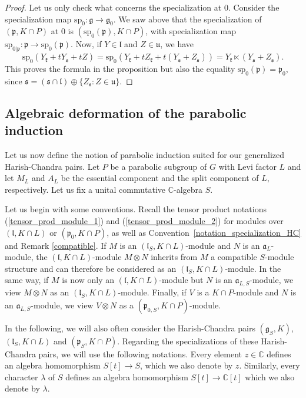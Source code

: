 \documentclass{amsart}
\theoremstyle{definition}
\begin{document}
\begin{proof}
    Let us only check what concerns the specialization at $0$. Consider the specialization map $\mathrm{sp}_0 : \bm{\mathfrak{g}} \to \mathfrak{g}_0$. We saw above that the specialization of  $(\bm{\mathfrak{p}},K\cap P)$ at $0$ is $(\mathrm{sp}_0(\bm{\mathfrak{p}}),K\cap P)$, with specialization map $\mathrm{sp}_{0|\bm{\mathfrak{p}}} : \bm{\mathfrak{p}} \to \mathrm{sp}_0(\bm{\mathfrak{p}})$. Now, if $Y \in \mathfrak{l}$ and $Z \in \mathfrak{u}$, we have
    \[\mathrm{sp}_0(Y_\mathfrak{k} + tY_\mathfrak{s} +tZ) = \mathrm{sp}_0(Y_\mathfrak{k} + tZ_\mathfrak{k} +t (Y_\mathfrak{s} + Z_\mathfrak{s})) = Y_\mathfrak{k} \ltimes (Y_\mathfrak{s} + Z_\mathfrak{s}).\]
    This proves the formula in the proposition but also the equality $\mathrm{sp}_0(\bm{\mathfrak{p}}) = \mathfrak{p}_0$, since $\mathfrak{s} = (\mathfrak{s}\cap \mathfrak{l}) \oplus \{Z_\mathfrak{s} : Z \in \mathfrak{u}\}$.
\end{proof}


\subsection{Algebraic deformation of the parabolic induction}\label{DeformationPI}
Let us now define the notion of parabolic induction suited for our generalized Harish-Chandra pairs. Let $P$ be a parabolic subgroup of $G$ with Levi factor $L$ and let $M_L$ and $A_L$ be the essential component and the split component of $L$, respectively. Let us fix a unital commutative $\mathbb{C}$-algebra $S$.

Let us begin with some conventions. Recall the tensor product notations (\ref{tensor_prod_module_1}) and (\ref{tensor_prod_module_2}) for modules over $(\mathfrak{l},K\cap L)$ or $(\mathfrak{p}_0,K\cap P)$, as well as Convention~\ref{notation_specialization_HC} and Remark \ref{compatible}. If $M$ is an $(\mathfrak{l}_S,K\cap L)$-module and $N$ is an $\mathfrak{a}_L$-module, the $(\mathfrak{l},K\cap L)$-module $M \otimes N$ inherits from $M$ a compatible $S$-module structure and can therefore be considered as an $(\mathfrak{l}_S,K\cap L)$-module. In the same way, if $M$ is now only an $(\mathfrak{l},K\cap L)$-module but $N$ is an $\mathfrak{a}_{L,S}$-module, we view $M\otimes N$ as an $(\mathfrak{l}_S,K\cap L)$-module. Finally, if $V$ is a $K\cap P$-module and $N$ is an $\mathfrak{a}_{L,S}$-module, we view $V \otimes N$ as a $(\mathfrak{p}_{0,S}, K\cap P)$-module.

In the following, we will also often consider the Harish-Chandra pairs $(\bm{\mathfrak{g}}_S,K)$, $(\bm{\mathfrak{l}}_S,K\cap L)$ and $(\bm{\mathfrak{p}}_S, K\cap P)$. Regarding the specializations of these Harish-Chandra pairs, we will use the following notations. Every element $z \in \mathbb{C}$ defines an algebra homomorphism $S[t] \to S$, which we also denote by $z$. Similarly, every character $\lambda$ of $S$ defines an algebra homomorphism $S[t] \to \mathbb{C}[t]$ which we also denote by $\lambda$.
\end{document}
